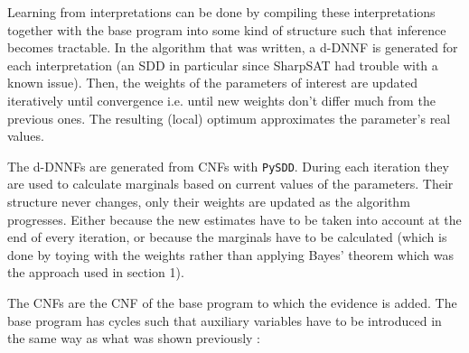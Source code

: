 

Learning from interpretations can be done by compiling these interpretations together with the base program into some kind of structure such that inference becomes tractable. In the algorithm that was written, a d-DNNF is generated for each interpretation (an SDD in particular since SharpSAT had trouble with a known issue). Then, the weights of the parameters of interest are updated iteratively until convergence i.e. until new weights don't differ much from the previous ones. The resulting (local) optimum approximates the parameter's real values.\\

\par\noindent The d-DNNFs are generated from CNFs with \texttt{PySDD}. During each iteration they are used to calculate marginals based on current values of the parameters. Their structure never changes, only their weights are updated as the algorithm progresses. Either because the new estimates have to be taken into account at the end of every iteration, or because the marginals have to be calculated (which is done by toying with the weights rather than applying Bayes' theorem which was the approach used in section 1).\\

\par\noindent The CNFs are the CNF of the base program to which the evidence is added. The base program has cycles such that auxiliary variables have to be introduced in the same way as what was shown previously : 

